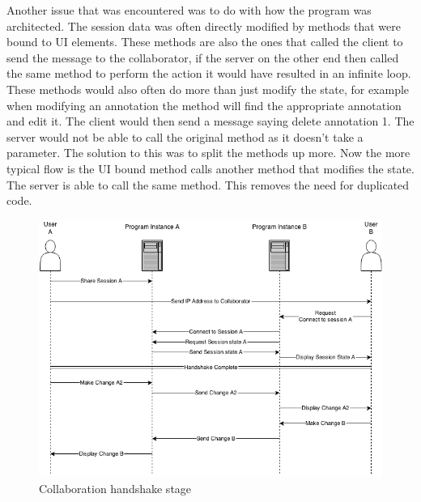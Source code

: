Another issue that was encountered was to do with how the program was architected.  The session data was often directly modified by methods that were bound to \ac{UI} elements.  These methods are also the ones that called the client to send the message to the collaborator, if the server on the other end then called the same method to perform the action it would have resulted in an infinite loop.  These methods would also often do more than just modify the state, for example when modifying an annotation the method will find the appropriate annotation and edit it.  The client would then send a message saying delete annotation 1.  The server would not be able to call the original method as it doesn't take a parameter.  The solution to this was to split the methods up more.  Now the more typical flow is the \ac{UI} bound method calls another method that modifies the state.  The server is able to call the same method.  This removes the need for duplicated code.

\begin{figure}[h!]
    \centering
    \includegraphics[width=\textwidth]{images/minf_collab_diagram.png}
    \caption{Collaboration handshake stage}
    \label{fig:collab_handshake}
\end{figure}

